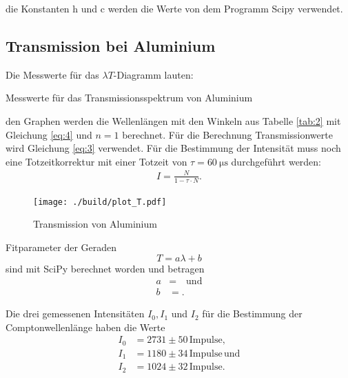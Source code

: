 \justifying die Konstanten h und c werden die Werte von dem Programm Scipy  \cite{scipy} verwendet.

\subsection{Transmission bei Aluminium}

Die Messwerte für das $\lambda T$-Diagramm lauten:  

\begin{table}[H]
    \centering
    
    \caption{Messwerte für das Transmissionsspektrum von Aluminium}
    \label{tab:2}
\end{table}


\justifying den Graphen werden die Wellenlängen mit den Winkeln aus Tabelle \ref{tab:2}
mit Gleichung \eqref{eq:4} und $n=1$ berechnet.
Für die Berechnung Transmissionwerte wird Gleichung \eqref{eq:3} verwendet.
Für die Bestimmung der Intensität muss noch eine Totzeitkorrektur mit einer
Totzeit von $\tau = \SI{60}{\micro\second} $ durchgeführt werden:
\begin{align}
    I = \frac{N}{1-\tau \cdot N} \label{eq:9}.
\end{align}

\begin{figure}[H]
    \centering
    \texttt{[image: ./build/plot\_T.pdf]}
    \caption{Transmission von Aluminium \cite{matplotlib}}
    \label{fig:4}
\end{figure}

 Fitparameter der Geraden 
\begin{equation}
    T=a \lambda +b \label{eq:10}
\end{equation}
sind mit SciPy \cite{scipy} berechnet worden und betragen 
\begin{align}
    a &= \text{}\quad \text{und} \label{eq:11} \\
    b &= \text{}.\label{eq:12}
\end{align}

Die drei gemessenen Intensitäten $I_0, I_1$ und $I_2$ für die Bestimmung der Comptonwellenlänge
haben die Werte
\begin{subequations}
\begin{align}
    I_0 &= 2731\pm 50 \,\text{Impulse} \label{eq:13a}, \\
    I_1 &= 1180 \pm 34\,\text{Impulse}\, \label{eq:13b} \text{und} \\
    I_2 &=1024\pm 32 \,\text{Impulse}\label{eq:13c}.
\end{align}
\end{subequations}

